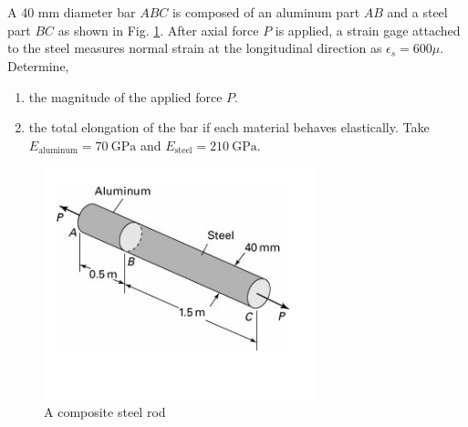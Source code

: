 \section{}

A 40 mm diameter bar $ABC$ is composed of an aluminum part $AB$ and a steel part $BC$ as shown in Fig. \ref{fig:fig3}. 
After axial force $P$ is applied, a strain gage attached to the steel measures normal strain at the longitudinal direction 
as $\epsilon_s = 600 \mu$. Determine,
\begin{enumerate}[label=(\alph*)]
    \item the magnitude of the applied force $P$.
    \item the total elongation of the bar if each material behaves elastically. Take $E_{\text{aluminum}} = \qty{70}{\giga\pascal}$ 
    and $E_{\text{steel}} = \qty{210}{\giga\pascal}$.  
\end{enumerate}

\begin{figure}[h]
    \centering
    \includegraphics[width=0.3\linewidth]{Questions/Figures/Q4ProblemDiagram.png}
    \caption{A composite steel rod}
    \label{fig:fig3}
\end{figure}

